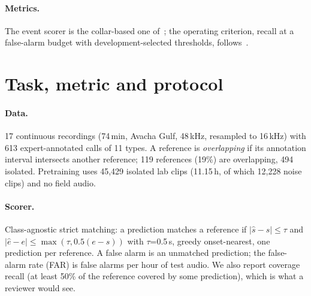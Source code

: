 \documentclass[10pt,twocolumn]{article}
\begin{document}
\paragraph{Metrics.} The event scorer is the collar-based one of~\citep{mesaros2016metrics}; the operating criterion, recall at a false-alarm budget with development-selected thresholds, follows~\citep{sheipak2026mmb,sheipak2026what}.

\section{Task, metric and protocol}
\label{sec:protocol}
\paragraph{Data.} 17 continuous recordings (74\,min, Avacha Gulf, 48\,kHz, resampled to 16\,kHz) with 613 expert-annotated calls of 11 types. A reference is \emph{overlapping} if its annotation interval intersects another reference; 119 references (19\%) are overlapping, 494 isolated. Pretraining uses 45{,}429 isolated lab clips (11.15\,h, of which 12{,}228 noise clips) and no field audio.
\paragraph{Scorer.} Class-agnostic strict matching: a prediction matches a reference if $|\hat s-s|\le\tau$ and $|\hat e-e|\le\max(\tau,0.5(e-s))$ with $\tau$=0.5\,s, greedy onset-nearest, one prediction per reference. A false alarm is an unmatched prediction; the false-alarm rate (FAR) is false alarms per hour of test audio. We also report coverage recall (at least 50\% of the reference covered by some prediction), which is what a reviewer would see.
\end{document}
